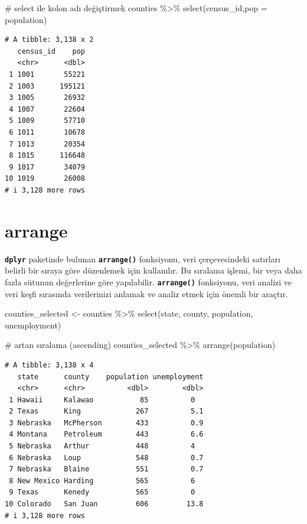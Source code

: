 \documentclass[
  letterpaper,
  DIV=11,
  numbers=noendperiod]{scrreprt}
\newenvironment{Shaded}{\begin{snugshade}}{\end{snugshade}}
\newcommand{\AttributeTok}[1]{\textcolor[rgb]{0.40,0.45,0.13}{#1}}
\newcommand{\CommentTok}[1]{\textcolor[rgb]{0.37,0.37,0.37}{#1}}
\newcommand{\FunctionTok}[1]{\textcolor[rgb]{0.28,0.35,0.67}{#1}}
\newcommand{\NormalTok}[1]{\textcolor[rgb]{0.00,0.23,0.31}{#1}}
\newcommand{\OtherTok}[1]{\textcolor[rgb]{0.00,0.23,0.31}{#1}}
\newcommand{\SpecialCharTok}[1]{\textcolor[rgb]{0.37,0.37,0.37}{#1}}
\begin{document}
\begin{Shaded}
\begin{Highlighting}[]
\CommentTok{\# select ile kolon adı değiştirmek}
\NormalTok{counties }\SpecialCharTok{\%\textgreater{}\%}
\FunctionTok{select}\NormalTok{(census\_id,}\AttributeTok{pop =}\NormalTok{ population)}
\end{Highlighting}
\end{Shaded}

\begin{verbatim}
# A tibble: 3,138 x 2
   census_id    pop
   <chr>      <dbl>
 1 1001       55221
 2 1003      195121
 3 1005       26932
 4 1007       22604
 5 1009       57710
 6 1011       10678
 7 1013       20354
 8 1015      116648
 9 1017       34079
10 1019       26008
# i 3,128 more rows
\end{verbatim}

\hypertarget{arrange}{%
\section*{arrange}\label{arrange}}


\textbf{\texttt{dplyr}} paketinde bulunan \textbf{\texttt{arrange()}}
fonksiyonu, veri çerçevesindeki satırları belirli bir sıraya göre
düzenlemek için kullanılır. Bu sıralama işlemi, bir veya daha fazla
sütunun değerlerine göre yapılabilir. \textbf{\texttt{arrange()}}
fonksiyonu, veri analizi ve veri keşfi sırasında verilerinizi anlamak ve
analiz etmek için önemli bir araçtır.

\begin{Shaded}
\begin{Highlighting}[]
\NormalTok{counties\_selected }\OtherTok{\textless{}{-}}\NormalTok{ counties }\SpecialCharTok{\%\textgreater{}\%}
\FunctionTok{select}\NormalTok{(state, county, population, unemployment)}

\CommentTok{\# artan sıralama (ascending)}
\NormalTok{counties\_selected }\SpecialCharTok{\%\textgreater{}\%}
\FunctionTok{arrange}\NormalTok{(population)}
\end{Highlighting}
\end{Shaded}

\begin{verbatim}
# A tibble: 3,138 x 4
   state      county    population unemployment
   <chr>      <chr>          <dbl>        <dbl>
 1 Hawaii     Kalawao           85          0  
 2 Texas      King             267          5.1
 3 Nebraska   McPherson        433          0.9
 4 Montana    Petroleum        443          6.6
 5 Nebraska   Arthur           448          4  
 6 Nebraska   Loup             548          0.7
 7 Nebraska   Blaine           551          0.7
 8 New Mexico Harding          565          6  
 9 Texas      Kenedy           565          0  
10 Colorado   San Juan         606         13.8
# i 3,128 more rows
\end{verbatim}
\end{document}
